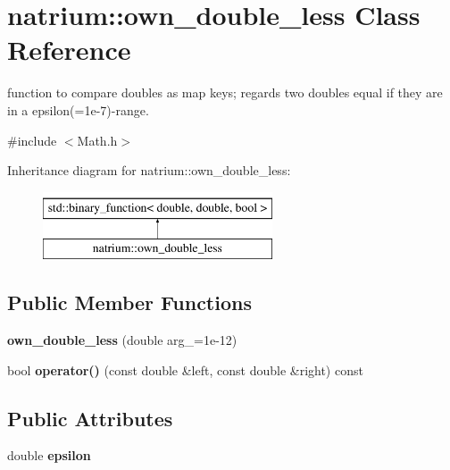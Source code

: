 \hypertarget{classnatrium_1_1own__double__less}{\section{natrium\-:\-:own\-\_\-double\-\_\-less Class Reference}
\label{classnatrium_1_1own__double__less}
}


function to compare doubles as map keys; regards two doubles equal if they are in a epsilon(=1e-\/7)-\/range.  




{\ttfamily \#include $<$Math.\-h$>$}

Inheritance diagram for natrium\-:\-:own\-\_\-double\-\_\-less\-:\begin{figure}[H]
\begin{center}
\leavevmode
\includegraphics[height=2.000000cm]{classnatrium_1_1own__double__less}
\end{center}
\end{figure}
\subsection*{Public Member Functions}
\begin{DoxyCompactItemize}
\item 
\hypertarget{classnatrium_1_1own__double__less_afda4d2a9a2d89c7033c94f246bd9f2c7}{{\bfseries own\-\_\-double\-\_\-less} (double arg\-\_\-=1e-\/12)}\label{classnatrium_1_1own__double__less_afda4d2a9a2d89c7033c94f246bd9f2c7}

\item 
\hypertarget{classnatrium_1_1own__double__less_a79f21afda2b0b72708c20ce78080dbc7}{bool {\bfseries operator()} (const double \&left, const double \&right) const }\label{classnatrium_1_1own__double__less_a79f21afda2b0b72708c20ce78080dbc7}

\end{DoxyCompactItemize}
\subsection*{Public Attributes}
\begin{DoxyCompactItemize}
\item 
\hypertarget{classnatrium_1_1own__double__less_a5de868df983787412438c481c21621a7}{double {\bfseries epsilon}}\label{classnatrium_1_1own__double__less_a5de868df983787412438c481c21621a7}

\end{DoxyCompactItemize}


